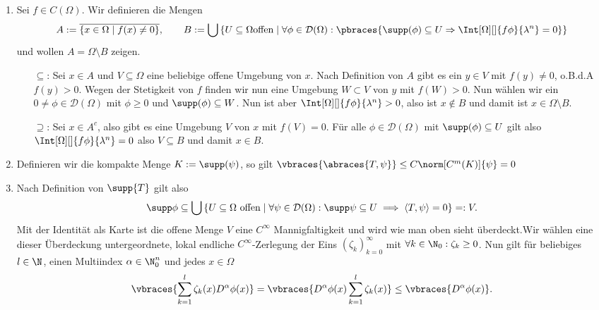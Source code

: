 \begin{solution}
\phantom{}
\begin{enumerate}[label = (\roman*)]
	\item Sei $f \in C(\Omega)$. Wir definieren die Mengen
	\begin{align*}
	A := \overline{\{x \in \Omega \mid f(x) \neq 0 \}}, \qquad B := \bigcup \left\{U \subseteq \Omega \text{offen} \mid \forall \phi \in \mathcal{D}(\Omega): \pbraces{\supp(\phi) \subseteq U \Rightarrow \Int[\Omega][]{f\phi}{\lambda^n} = 0} \right\}
	\end{align*}
	und wollen $A = \Omega \setminus B$ zeigen.
	\begin{enumerate}
		\item[$\subseteq$:] Sei $x \in A$ und $V \subseteq \Omega$ eine beliebige offene Umgebung von $x$. Nach Definition von $A$ gibt es ein $y \in V$ mit $f(y) \neq 0$, o.B.d.A $f(y) > 0$. Wegen der Stetigkeit von $f$ finden wir nun eine Umgebung $W \subset V$ von $y$ mit $f(W) > 0$. Nun wählen wir ein $0 \neq \phi \in \mathcal{D}(\Omega)$ mit $\phi \geq 0$ und $\supp(\phi) \subseteq W$. Nun ist aber $\Int[\Omega][]{f\phi}{\lambda^n} > 0$, also ist $x \notin B$ und damit ist $x \in \Omega \setminus B$.
		\item[$\supseteq$:] Sei $x \in A^c$, also gibt es eine Umgebung $V$ von $x$ mit $f(V) = 0$. Für alle $\phi \in \mathcal{D}(\Omega)$ mit $\supp(\phi) \subseteq U$ gilt also $\Int[\Omega][]{f\phi}{\lambda^n} = 0$ also $V \subseteq B$ und damit $x \in B$.
	\end{enumerate}
	\item Definieren wir die kompakte Menge $K := \supp(\psi)$, so gilt $\vbraces{\abraces{T, \psi}} \leq C \norm[C^m(K)]{\psi} = 0$
	\item Nach Definition von $\supp{T}$ gilt also
\begin{align}
    \supp\phi \subseteq \bigcup \left\{U \subseteq \Omega \text{~offen} \mid \forall \psi \in \mathcal{D}(\Omega): \supp\psi \subseteq U \implies \langle T, \psi\rangle = 0 \right\} =: V.
\end{align}
Mit der Identität als Karte ist die offene Menge $V$ eine $C^\infty$ Mannigfaltigkeit und wird wie man oben sieht überdeckt.Wir wählen eine dieser Überdeckung untergeordnete, lokal endliche $C^\infty$-Zerlegung der Eins $(\zeta_k)_{k=0}^\infty$ mit $\forall k \in \N_0: \zeta_k \geq 0$. Nun gilt für beliebiges $l \in \N$, einen Multiindex $\alpha \in \N_0^n$ und jedes $x \in \Omega$
\begin{align*}
\vbraces{\sum_{k=1}^l \zeta_k(x) D^\alpha \phi(x)} =  \vbraces{D^\alpha \phi(x) \sum_{k=1}^l \zeta_k(x) } \leq \vbraces{D^\alpha \phi(x)}.

\end{align*}
\end{enumerate}
\end{solution}
